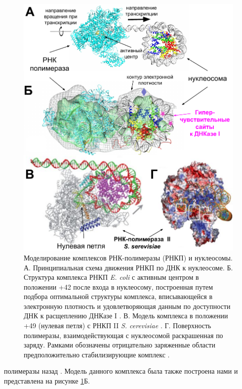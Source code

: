 \begin{figure} [H]
    \centering
    \includegraphics[width=\textwidth]{images/p6/p6_2/p6_2_polII_synopsis.pdf}
    \caption{Моделирование комплексов РНК-полимеразы (РНКП) и нуклеосомы. А. Принципиальная схема движения РНКП по ДНК к нуклеосоме. Б. Структура комплекса РНКП \textit{E. coli} с активным центром в положении +42 после входа в нуклеосому, построенная путем подбора оптимальной структуры комплекса, вписывающейся в электронную плотность и удовлетворяющая данным по доступности ДНК к расщеплению ДНКазе I \cite{gaykalova_structural_2015}. В. Модель комплекса в положении +49 (нулевая петля) с РНКП II \textit{S. cerevisiae} \cite{chang_analysis_2014}. Г. Поверхность полимеразы, взаимодействующая с нуклеосомой раскрашенная по заряду. Рамками обозначены отрицательно заряженные области предположительно стабилизирующие комплекс \cite{chang_analysis_2014}. }
    \label{fig:p6_2_polII_synopsis}
\end{figure}

\noindent
полимеразы назад \cite{gaykalova_structural_2015}. Модель данного комплекса была также построена нами и представлена на рисунке \ref{fig:p6_2_polII_synopsis}Б.

